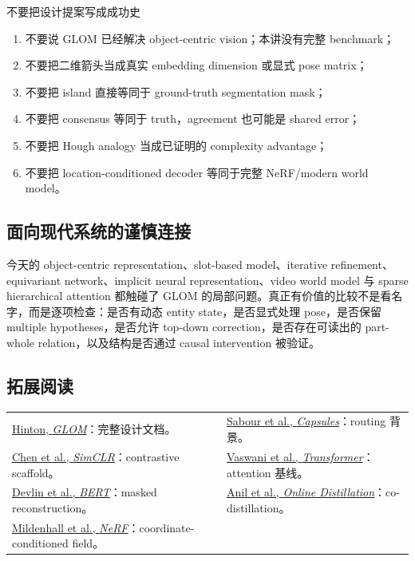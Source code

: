 \begin{warningbox}{不要把设计提案写成成功史}
\begin{enumerate}
  \item 不要说 GLOM 已经解决 object-centric vision；本讲没有完整 benchmark；
  \item 不要把二维箭头当成真实 embedding dimension 或显式 pose matrix；
  \item 不要把 island 直接等同于 ground-truth segmentation mask；
  \item 不要把 consensus 等同于 truth，agreement 也可能是 shared error；
  \item 不要把 Hough analogy 当成已证明的 complexity advantage；
  \item 不要把 location-conditioned decoder 等同于完整 NeRF/modern world model。
\end{enumerate}
\end{warningbox}

\subsection{面向现代系统的谨慎连接}

今天的 object-centric representation、slot-based model、iterative refinement、equivariant network、implicit neural representation、video world model 与 sparse hierarchical attention 都触碰了 GLOM 的局部问题。真正有价值的比较不是看名字，而是逐项检查：是否有动态 entity state，是否显式处理 pose，是否保留 multiple hypotheses，是否允许 top-down correction，是否存在可读出的 part-whole relation，以及结构是否通过 causal intervention 被验证。


\subsection{拓展阅读}

\begin{center}
\footnotesize
\begin{tabularx}{\textwidth}{>{\raggedright\arraybackslash}X>{\raggedright\arraybackslash}X}
\href{https://arxiv.org/abs/2102.12627}{Hinton, \emph{GLOM}}：完整设计文档。 &
\href{https://arxiv.org/abs/1710.09829}{Sabour et al., \emph{Capsules}}：routing 背景。 \\[0.25em]
\href{https://arxiv.org/abs/2002.05709}{Chen et al., \emph{SimCLR}}：contrastive scaffold。 &
\href{https://arxiv.org/abs/1706.03762}{Vaswani et al., \emph{Transformer}}：attention 基线。 \\[0.25em]
\href{https://arxiv.org/abs/1810.04805}{Devlin et al., \emph{BERT}}：masked reconstruction。 &
\href{https://arxiv.org/abs/1804.03235}{Anil et al., \emph{Online Distillation}}：co-distillation。 \\[0.25em]
\href{https://arxiv.org/abs/2003.08934}{Mildenhall et al., \emph{NeRF}}：coordinate-conditioned field。 & \\
\end{tabularx}
\end{center}


